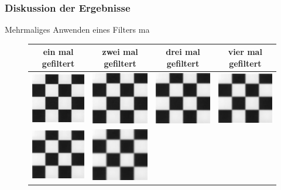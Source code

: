 \documentclass[12pt,german]{article}
\begin{document}
\subsubsection{Diskussion der Ergebnisse}
Mehrmaliges Anwenden eines Filters ma
\begin{figure} [H]
  \centering
  \begin{tabular}{| c | c | c | c |}
    \hline
    ein mal gefiltert & zwei mal gefiltert & drei mal gefiltert & vier mal gefiltert \\
    \hline
	\includegraphics[width=3cm]{../testData/Gauss/SchachbrettR4S4v1.jpg} & 	
	\includegraphics[width=3cm]{../testData/Gauss/SchachbrettR4S4v2.jpg} &
	\includegraphics[width=3cm]{../testData/Gauss/SchachbrettR4S4v3.jpg} & 	
	\includegraphics[width=3cm]{../testData/Gauss/SchachbrettR4S4v4.jpg} \\
	    \hline
	\includegraphics[width=3cm]{../testData/Gauss/SchachbrettR40S4v1.jpg} & 	
	\includegraphics[width=3cm]{../testData/Gauss/SchachbrettR40S4v2.jpg} &

\end{tabular}
\end{figure}
\end{document}
